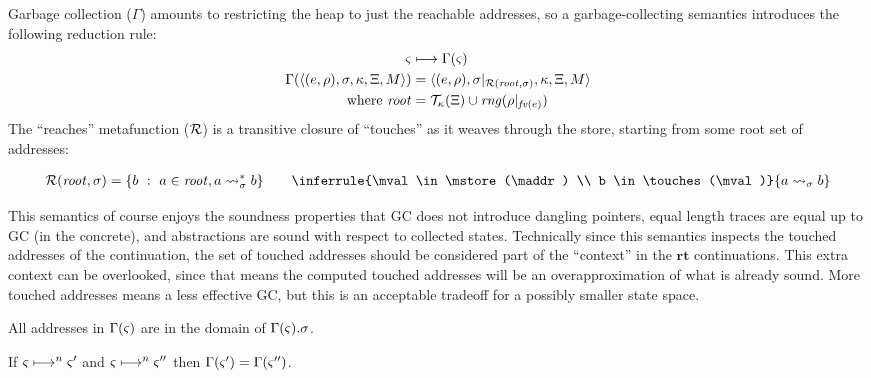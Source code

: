Garbage collection ($\Gamma$) amounts to restricting the heap to just the reachable addresses, so a garbage-collecting semantics introduces the following reduction rule:
\begin{align*}
  \varsigma &\longmapsto \Gamma(\varsigma) \\
  \Gamma(\langle (e,\rho),\sigma,\kappa, \Xi, M \rangle) &= \langle (e,\rho),\sigma|_{{\mathcal R}(\mathit{root}, \sigma)}, \kappa, \Xi, M \rangle \\
  \text{where } \mathit{root} &= {\mathcal T}_{\kappa}(\Xi) \cup \mathit{rng}(\rho|_{\mathit{fv}(e)})
\end{align*}
%
The ``reaches'' metafunction (${\mathcal R}$) is a transitive closure of ``touches'' as it weaves through the store, starting from some root set of addresses:

\begin{align*}
  \reaches(\mathit{root}, \mstore) = \setbuild{b}{\maddr \in \mathit{root}, \maddr \rightsquigarrow_\mstore^* b}
   \qquad
               \inferrule{\mval \in \mstore(\maddr) \\
                             b \in \touches(\mval)}
                            {\maddr \rightsquigarrow_\mstore b}
\end{align*}

This semantics of course enjoys the soundness properties that GC does not introduce dangling pointers, equal length traces are equal up to GC (in the concrete), and abstractions are sound with respect to collected states.
%
Technically since this semantics inspects the touched addresses of the continuation, the set of touched addresses should be considered part of the ``context'' in the $\mathbf{rt}$ continuations.
%
This extra context can be overlooked, since that means the computed touched addresses will be an overapproximation of what is already sound.
%
More touched addresses means a less effective GC, but this is an acceptable tradeoff for a possibly smaller state space.
%
\begin{claim}\label{thm:gc-pointers}
  All addresses in $\Gamma(\varsigma)$ are in the domain of $\Gamma(\varsigma).\sigma$.
\end{claim}

\begin{claim}\label{thm:gc-concrete}
  If $\varsigma \longmapsto^n \varsigma'$ and $\varsigma \longmapsto^n \varsigma''$ then $\Gamma(\varsigma') = \Gamma(\varsigma'')$.
\end{claim}

